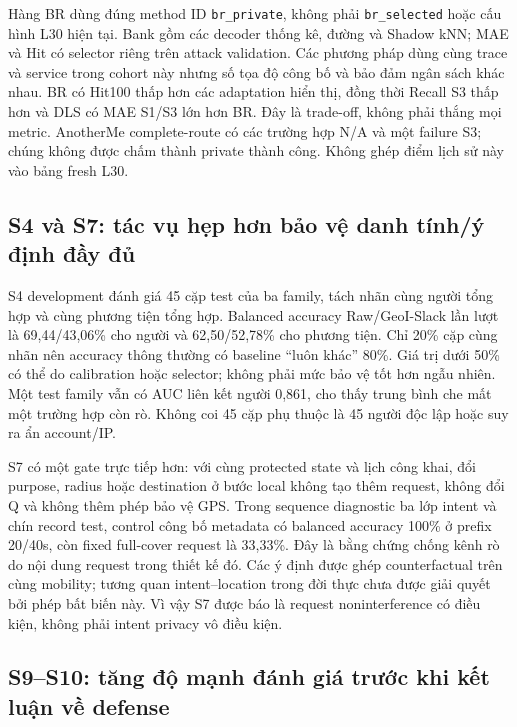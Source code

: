 Hàng BR dùng đúng method ID \texttt{br\_private}, không phải
\texttt{br\_selected} hoặc cấu hình L30 hiện tại. Bank gồm các decoder thống
kê, đường và Shadow kNN; MAE và Hit có selector riêng trên attack validation.
Các phương pháp dùng cùng trace và service trong cohort này nhưng số tọa độ
công bố và bảo đảm ngân sách khác nhau. BR có Hit100 thấp hơn các adaptation
hiển thị, đồng thời Recall S3 thấp hơn và DLS có MAE S1/S3 lớn hơn BR. Đây là
trade-off, không phải thắng mọi metric. AnotherMe complete-route có các trường
hợp N/A và một failure S3; chúng không được chấm thành private thành công.
Không ghép điểm lịch sử này vào bảng fresh L30.

\subsection{S4 và S7: tác vụ hẹp hơn bảo vệ danh tính/ý định đầy đủ}

S4 development đánh giá 45 cặp test của ba family, tách nhãn cùng người tổng
hợp và cùng phương tiện tổng hợp. Balanced accuracy Raw/GeoI-Slack lần lượt
là 69,44/43,06\% cho người và 62,50/52,78\% cho phương tiện. Chỉ 20\% cặp
cùng nhãn nên accuracy thông thường có baseline ``luôn khác'' 80\%.
Giá trị dưới 50\% có thể do calibration hoặc selector; không phải mức bảo vệ
tốt hơn ngẫu nhiên. Một test family vẫn có AUC liên kết người 0,861, cho thấy
trung bình che mất một trường hợp còn rò. Không coi 45 cặp phụ thuộc là 45
người độc lập hoặc suy ra ẩn account/IP.

S7 có một gate trực tiếp hơn: với cùng protected state và lịch công khai,
đổi purpose, radius hoặc destination ở bước local không tạo thêm request,
không đổi Q và không thêm phép bảo vệ GPS. Trong sequence diagnostic ba lớp
intent và chín record test, control công bố metadata có balanced accuracy
100\% ở prefix 20/40s, còn fixed full-cover request là 33,33\%. Đây là bằng
chứng chống kênh rò do nội dung request trong thiết kế đó. Các ý định được
ghép counterfactual trên cùng mobility; tương quan intent--location trong
đời thực chưa được giải quyết bởi phép bất biến này. Vì vậy S7 được báo là
request noninterference có điều kiện, không phải intent privacy vô điều kiện.



\subsection{S9--S10: tăng độ mạnh đánh giá trước khi kết luận về defense}

